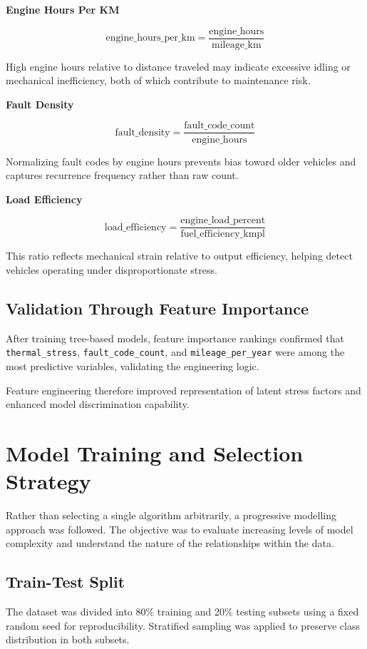 \documentclass[12pt, a4paper]{article}
\begin{document}
\textbf{Engine Hours Per KM}

\[
\text{engine\_hours\_per\_km} = \frac{\text{engine\_hours}}{\text{mileage\_km}}
\]

High engine hours relative to distance traveled may indicate excessive idling or mechanical inefficiency, both of which contribute to maintenance risk.

\textbf{Fault Density}

\[
\text{fault\_density} = \frac{\text{fault\_code\_count}}{\text{engine\_hours}}
\]

Normalizing fault codes by engine hours prevents bias toward older vehicles and captures recurrence frequency rather than raw count.

\textbf{Load Efficiency}

\[
\text{load\_efficiency} = \frac{\text{engine\_load\_percent}}{\text{fuel\_efficiency\_kmpl}}
\]

This ratio reflects mechanical strain relative to output efficiency, helping detect vehicles operating under disproportionate stress.

\subsection{Validation Through Feature Importance}

After training tree-based models, feature importance rankings confirmed that \texttt{thermal\_stress}, \texttt{fault\_code\_count}, and \texttt{mileage\_per\_year} were among the most predictive variables, validating the engineering logic.

Feature engineering therefore improved representation of latent stress factors and enhanced model discrimination capability.

\newpage
\section{Model Training and Selection Strategy}

Rather than selecting a single algorithm arbitrarily, a progressive modelling approach was followed. The objective was to evaluate increasing levels of model complexity and understand the nature of the relationships within the data.

\subsection{Train-Test Split}

The dataset was divided into 80\% training and 20\% testing subsets using a fixed random seed for reproducibility. Stratified sampling was applied to preserve class distribution in both subsets.
\end{document}
